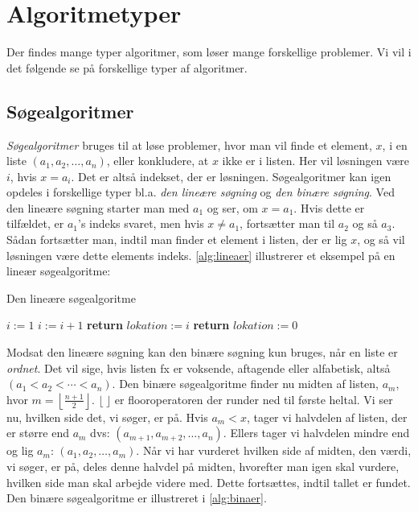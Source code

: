 \section{Algoritmetyper}
Der findes mange typer algoritmer, som løser mange forskellige problemer. Vi vil i det følgende se på forskellige typer af algoritmer.
\subsection{Søgealgoritmer}
\emph{Søgealgoritmer} bruges til at løse problemer, hvor man vil finde et element, $x$, i en liste $(a_{1}, a_{2}, \dotsc, a_{n})$, eller konkludere, at $x$ ikke er i listen. Her vil løsningen være $i$, hvis $x=a_{i}$. Det er altså indekset, der er løsningen. Søgealgoritmer kan igen opdeles i forskellige typer bl.a. \emph{den lineære søgning} og \emph{den binære søgning}. Ved den lineære søgning starter man med $a_1$ og ser, om $x=a_{1}$. Hvis dette er tilfældet, er $a_{1}$'s indeks svaret, men hvis $x \neq a_{1}$, fortsætter man til $a_{2}$ og så $a_{3}$. Sådan fortsætter man, indtil man finder et element i listen, der er lig $x$, og så vil løsningen være dette elements indeks. \autoref{alg:lineaer} illustrerer et eksempel på en lineær søgealgoritme:

\begin{algorithm}[H] 
\caption{Den lineære søgealgoritme}
\begin{algorithmic}[1]

    \State $i:=1$
        \State $i:=i+1$
    \EndWhile
    \State \textbf{return} $lokation:=i$
    \Else
    \State \textbf{return} $lokation:=0$
    \EndIf
  \label{roy's loop}
\EndProcedure

\end{algorithmic}
\label{alg:lineaer}
\end{algorithm}


Modsat den lineære søgning kan den binære søgning kun bruges, når en liste er \emph{ordnet}. Det vil sige, hvis listen fx er voksende, aftagende eller alfabetisk, altså $(a_{1}<a_{2}<\dotsb<a_{n})$. Den binære søgealgoritme finder nu midten af listen, $a_{m}$, hvor $m=\left \lfloor \frac{n+1}{2} \right \rfloor$. $\lfloor \ \rfloor$ er flooroperatoren der runder ned til første heltal. Vi ser nu, hvilken side det, vi søger, er på. Hvis $a_{m}<x$, tager vi halvdelen af listen, der er større end $a_{m}$ dvs: $(a_{m+1}, a_{m+2},\dotsc,a_{n})$. Ellers tager vi halvdelen mindre end og lig $a_{m}$: $(a_{1}, a_{2},\dotsc,a_{m})$. Når vi har vurderet hvilken side af midten, den værdi, vi søger, er på, deles denne halvdel på midten, hvorefter man igen skal vurdere, hvilken side man skal arbejde videre med. Dette fortsættes, indtil tallet er fundet. Den binære søgealgoritme er illustreret i \autoref{alg:binaer}.

